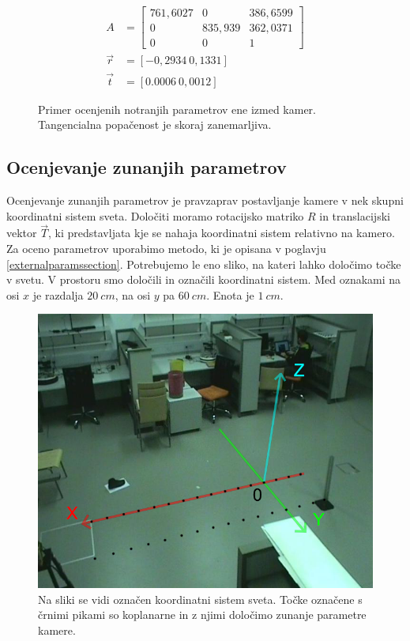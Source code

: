 \documentclass[a4paper, 12pt]{book}
\begin{document}
\begin{figure}[H]
\begin{align}
A &= 
\begin{bmatrix}
761,6027 & 0 & 386,6599 \\
0 & 835,939 & 362,0371 \\
0 & 0 & 1
\end{bmatrix} \\
\vec{r} &= [-0,2934 \ 0,1331] \\
\vec{t} &= [0.0006 \ 0,0012]
\end{align}
\caption{Primer ocenjenih notranjih parametrov ene izmed kamer. Tangencialna popačenost je skoraj zanemarljiva.}
\end{figure}


\subsection{Ocenjevanje zunanjih parametrov}
Ocenjevanje zunanjih parametrov je pravzaprav postavljanje kamere v nek skupni koordinatni sistem sveta. Določiti moramo rotacijsko matriko $R$ in translacijski vektor $\vec{T}$, ki predstavljata kje se nahaja koordinatni sistem relativno na kamero. Za oceno parametrov uporabimo metodo, ki je opisana v poglavju \ref{externalparamssection}. Potrebujemo le eno sliko, na kateri lahko določimo točke v svetu. V prostoru smo določili in označili koordinatni sistem. Med oznakami na osi $x$ je razdalja $20 \ cm$, na osi $y$ pa $60 \ cm$. Enota je $1 \ cm$.

\begin{figure}[H]
\centering
\includegraphics[width=\textwidth,height=\textheight,keepaspectratio]{coord_system.png}
\caption{Na sliki se vidi označen koordinatni sistem sveta. Točke označene s črnimi pikami so koplanarne in z njimi določimo zunanje parametre kamere.}
\label{coordsystemimg}
\end{figure}
\end{document}
